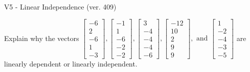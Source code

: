 \begin{exercise}
  \begin{exerciseTitle}V5 - Linear Independence (ver. 409)\end{exerciseTitle}
  \begin{exerciseStatement}
    Explain why the vectors \(\left[\begin{array}{r}
-6 \\
2 \\
-6 \\
1 \\
-3
\end{array}\right] , \left[\begin{array}{r}
-1 \\
1 \\
-6 \\
-2 \\
-2
\end{array}\right] , \left[\begin{array}{r}
3 \\
-4 \\
-4 \\
-4 \\
-6
\end{array}\right] , \left[\begin{array}{r}
-12 \\
10 \\
2 \\
9 \\
9
\end{array}\right] , \text{ and } \left[\begin{array}{r}
1 \\
-2 \\
-4 \\
-3 \\
-5
\end{array}\right]\) are linearly dependent or linearly independent.	



\end{exerciseStatement}
\end{exercise}
